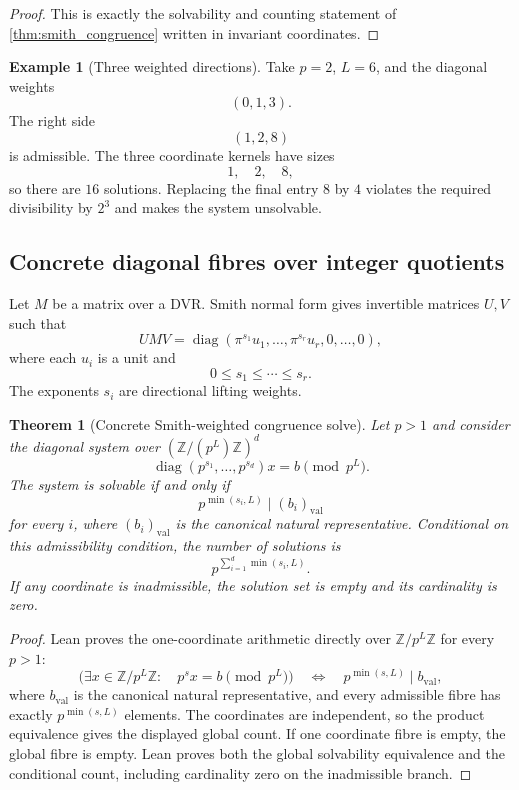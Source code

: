 \documentclass[11pt,a4paper]{article}
\newtheorem{theorem}{Theorem}[section]
\theoremstyle{definition}
\newtheorem{example}[example]{Example}
\theoremstyle{remark}
\newcommand{\diag}{\operatorname{diag}}
\providecommand{\diag}{\operatorname{diag}}
\providecommand{\Z}{\mathbb Z}
\theoremstyle{definition}\newtheorem{construction}[theorem]{Construction}\newtheorem{certificate}[theorem]{Numerical Certificate}
\theoremstyle{remark}\newtheorem{boundary}[theorem]{Boundary}
\begin{document}
\begin{proof}
This is exactly the solvability and counting statement of \cref{thm:smith_congruence} written in invariant coordinates.
\end{proof}

\begin{example}[Three weighted directions]\label{ex:smith_three}
Take $p=2$, $L=6$, and the diagonal weights
\[
(0,1,3).
\]
The right side
\[
(1,2,8)
\]
is admissible.  The three coordinate kernels have sizes
\[
1,
\quad2,
\quad8,
\]
so there are $16$ solutions.  Replacing the final entry $8$ by $4$ violates the required divisibility by $2^3$ and makes the system unsolvable.
\end{example}

\subsection{Concrete diagonal fibres over integer quotients}

Let $M$ be a matrix over a DVR. Smith normal form gives invertible matrices $U,V$ such that
\[
UMV
=
\diag(\pi^{s_1}u_1,\ldots,\pi^{s_r}u_r,0,\ldots,0),
\]
where each $u_i$ is a unit and
\[
0\le s_1\le\cdots\le s_r.
\]
The exponents $s_i$ are directional lifting weights.

\begin{theorem}[Concrete Smith-weighted congruence solve]\label{thm:smith-solve}
Let $p>1$ and consider the diagonal system over
$(\Z/(p^L)\Z)^d$
\[
\diag(p^{s_1},\ldots,p^{s_d})x=b
\pmod{p^L}.
\]
The system is solvable if and only if
\[
p^{\min(s_i,L)}\mid (b_i)_{\mathrm{val}}
\]
for every $i$, where $(b_i)_{\mathrm{val}}$ is the canonical natural
representative. Conditional on this admissibility condition, the number of
solutions is
\[
\boxed{
p^{\sum_{i=1}^d\min(s_i,L)}.
}
\]
If any coordinate is inadmissible, the solution set is empty and its
cardinality is zero.
\end{theorem}

\begin{proof}
Lean proves the one-coordinate arithmetic directly over
$\mathbb Z/p^L\mathbb Z$ for every $p>1$:
\[
\bigl(\exists x\in\mathbb Z/p^L\mathbb Z:\quad p^s x=b\pmod{p^L}\bigr)
\quad\Longleftrightarrow\quad
p^{\min(s,L)}\mid b_{\mathrm{val}},
\]
where $b_{\mathrm{val}}$ is the canonical natural representative, and every
admissible fibre has exactly $p^{\min(s,L)}$ elements. The coordinates are
independent, so the product equivalence gives the displayed global count. If
one coordinate fibre is empty, the global fibre is empty. Lean proves both the
global solvability equivalence and the conditional count, including
cardinality zero on the inadmissible branch.
\end{proof}
\end{document}
